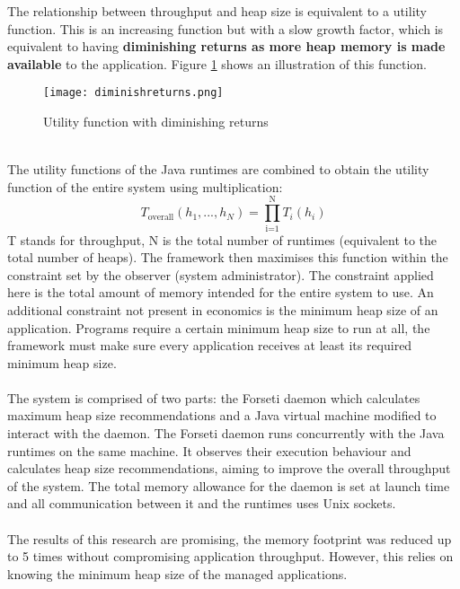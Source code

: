\documentclass{l4proj}
\begin{document}
The relationship between throughput and heap size is equivalent to a utility function. This is an increasing function but with a slow growth factor, which is equivalent to having \textbf{diminishing returns as more heap memory is made available} to the application\cite{forseti}. Figure \ref{diminishret} shows an illustration of this function.
\begin{figure}[!ht]
  \centering
    \texttt{[image: diminishreturns.png]}
    \caption{Utility function with diminishing returns\cite{forseti}}
    \label{diminishret}
\end{figure}\\
\hspace*{1em} The utility functions of the Java runtimes are combined to obtain the utility function of the entire system using multiplication:
\begin{equation}
T_\text{overall}(h_1,...,h_N) = \prod_\text{i=1}^\text{N}T_i(h_i) 
\end{equation}
T stands for throughput, N is the total number of runtimes (equivalent to the total number of heaps). The framework then maximises this function within the constraint set by the observer (system administrator). The constraint applied here is the total amount of memory intended for the entire system to use. An additional constraint not present in economics is the minimum heap size of an application. Programs require a certain minimum heap size to run at all, the framework must make sure every application receives at least its required minimum heap size\cite{forseti}.
\\\\
\hspace*{1em} The system is comprised of two parts: the Forseti daemon which calculates maximum heap size recommendations and a Java virtual machine modified to interact with the daemon. The Forseti daemon runs concurrently with the Java runtimes on the same machine. It observes their execution behaviour and calculates heap size recommendations, aiming to improve the overall throughput of the system. The total memory allowance for the daemon is set at launch time and all communication between it and the runtimes uses Unix sockets\cite{forseti}.
\\\\
\hspace*{1em} The results of this research are promising, the memory footprint was reduced up to 5 times without compromising application throughput. However, this relies on knowing the minimum heap size of the managed applications. 
\end{document}

